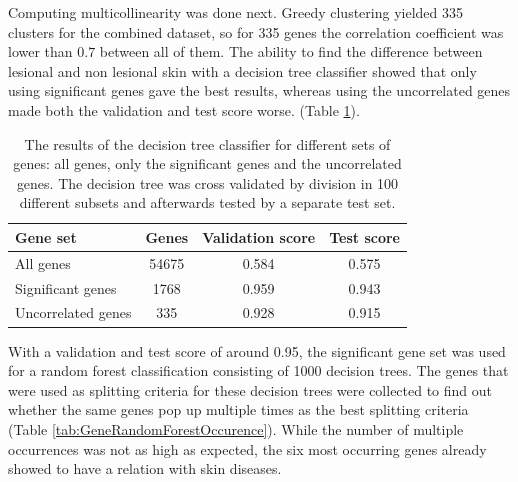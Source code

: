 \documentclass[10pt,a4paper]{article}
\begin{document}
	
	Computing multicollinearity was done next. Greedy clustering yielded 335 clusters for the combined dataset, so for 335 genes the correlation coefficient was lower than $0.7$ between all of them. The ability to find the difference between lesional and non lesional skin with a decision tree classifier showed that only using significant genes gave the best results, whereas using the uncorrelated genes made both the validation and test score worse. (Table \ref{tab:DecisionTreeResults}).
	
	\begin{table}[H]
		\centering
		\caption{The results of the decision tree classifier for different sets of genes: all genes, only the significant genes and the uncorrelated genes. The decision tree was cross validated by division in 100 different subsets and afterwards tested by a separate test set.}
		\label{tab:DecisionTreeResults}
		\begin{tabular}{l|ccc}
			\textbf{Gene set}                                            & \textbf{Genes} & \textbf{Validation score} & \textbf{Test score} \\ \hline
			All genes                                                    & 54675             & 0.584                     & 0.575               \\
			Significant genes                                            & 1768              & 0.959                     & 0.943               \\
			Uncorrelated genes & 335               & 0.928                     & 0.915              
		\end{tabular}
	\end{table}
	
	With a validation and test score of around 0.95, the significant gene set was used for a random forest classification consisting of 1000 decision trees. The genes that were used as splitting criteria for these decision trees were collected to find out whether the same genes pop up multiple times as the best splitting criteria (Table \ref{tab:GeneRandomForestOccurence}). While the number of multiple occurrences was not as high as expected, the six most occurring genes already showed to have a relation with skin diseases. 
	
\end{document}
